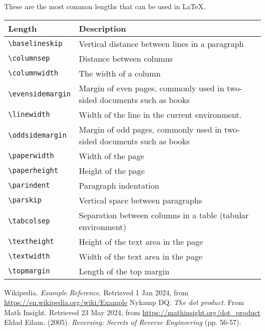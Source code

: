 \documentclass{article}
\begin{document}
\noindent{}
These are the most common lengths that can be used in \LaTeX.

\vspace{1em}
\begin{tabular}{| p{} | p{} |}
  \hline
  Length & Description \\
  \hline
  \verb|\baselineskip|   & Vertical distance between lines in a paragraph \\
  \verb|\columnsep|      & Distance between columns \\
  \verb|\columnwidth|    & The width of a column \\
  \verb|\evensidemargin| & Margin of even pages, commonly used in two-sided
                           documents such as books \\
  \verb|\linewidth|      & Width of the line in the current environment. \\
  \verb|\oddsidemargin|  & Margin of odd pages, commonly used in two-sided
                           documents such as books \\
  \verb|\paperwidth|     & Width of the page \\
  \verb|\paperheight|    & Height of the page \\
  \verb|\parindent|      & Paragraph indentation \\
  \verb|\parskip|        & Vertical space between paragraphs \\
  \verb|\tabcolsep|      & Separation between columns in a table (tabular
                           environment) \\
  \verb|\textheight|     & Height of the text area in the page \\
  \verb|\textwidth|      & Width of the text area in the page \\
  \verb|\topmargin|      & Length of the top margin \\
  \hline
\end{tabular}


\newpage
\begin{thebibliography}{9}
  Wikipedia. \textit{Example Reference}. Retrieved 1 Jan 2024, from
  \url{https://en.wikipedia.org/wiki/Example}
  Nykamp DQ. \textit{The dot product}. From Math Insight. Retrieved 23 May 2024,
  from \url{https://mathinsight.org/dot_product}
  Eldad Eilam. (2005). \textit{Reversing: Secrets of Reverse Engineering}
  (pp. 56-57). \end{thebibliography}
\end{document}
